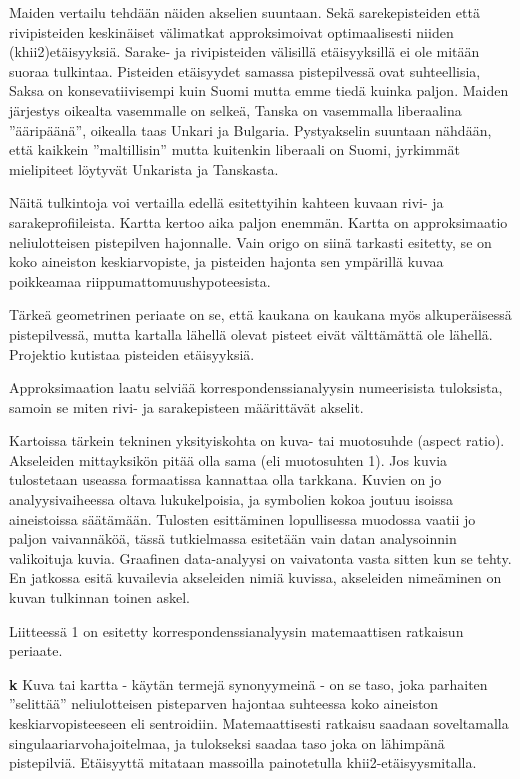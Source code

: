 \documentclass[
  finnish,
]{book}
\begin{document}
Maiden vertailu tehdään näiden akselien suuntaan. Sekä sarekepisteiden että
rivipisteiden keskinäiset välimatkat approksimoivat optimaalisesti niiden
(khii2)etäisyyksiä. Sarake- ja rivipisteiden välisillä etäisyyksillä ei ole
mitään suoraa tulkintaa. Pisteiden etäisyydet samassa pistepilvessä ovat
suhteellisia, Saksa on konsevatiivisempi kuin Suomi mutta emme tiedä kuinka paljon.
Maiden järjestys oikealta vasemmalle on selkeä, Tanska on vasemmalla
liberaalina ''ääripäänä'', oikealla taas Unkari ja Bulgaria. Pystyakselin suuntaan
nähdään, että kaikkein ''maltillisin'' mutta kuitenkin liberaali on Suomi,
jyrkimmät mielipiteet löytyvät Unkarista ja Tanskasta.

Näitä tulkintoja voi vertailla edellä esitettyihin kahteen kuvaan rivi- ja
sarakeprofiileista. Kartta kertoo aika paljon enemmän.
Kartta on approksimaatio neliulotteisen pistepilven hajonnalle. Vain origo on
siinä tarkasti esitetty, se on koko aineiston keskiarvopiste, ja pisteiden
hajonta sen ympärillä kuvaa poikkeamaa riippumattomuushypoteesista.

Tärkeä geometrinen periaate on se, että kaukana on kaukana myös alkuperäisessä
pistepilvessä, mutta kartalla lähellä olevat pisteet eivät välttämättä ole lähellä.
Projektio kutistaa pisteiden etäisyyksiä.

Approksimaation laatu selviää korrespondenssianalyysin numeerisista tuloksista,
samoin se miten rivi- ja sarakepisteen määrittävät akselit.

Kartoissa tärkein tekninen yksityiskohta on kuva- tai muotosuhde (aspect ratio).
Akseleiden mittayksikön pitää olla sama (eli muotosuhten 1). Jos kuvia
tulostetaan useassa formaatissa kannattaa olla tarkkana. Kuvien on jo
analyysivaiheessa oltava lukukelpoisia, ja symbolien kokoa joutuu isoissa
aineistoissa säätämään. Tulosten esittäminen lopullisessa muodossa vaatii jo
paljon vaivannäköä, tässä tutkielmassa esitetään vain datan analysoinnin
valikoituja kuvia. Graafinen data-analyysi on vaivatonta vasta sitten kun se tehty.
En jatkossa esitä kuvailevia akseleiden nimiä kuvissa,
akseleiden nimeäminen on kuvan tulkinnan toinen askel.

Liitteessä 1 on esitetty korrespondenssianalyysin matemaattisen ratkaisun periaate.

\textbf{k} Kuva tai kartta - käytän termejä synonyymeinä - on se taso, joka parhaiten
''selittää'' neliulotteisen pisteparven hajontaa suhteessa koko aineiston
keskiarvopisteeseen eli sentroidiin. Matemaattisesti ratkaisu saadaan
soveltamalla singulaariarvohajoitelmaa, ja tulokseksi saadaa taso joka on
lähimpänä pistepilviä. Etäisyyttä mitataan massoilla painotetulla
khii2-etäisyysmitalla.
\end{document}
